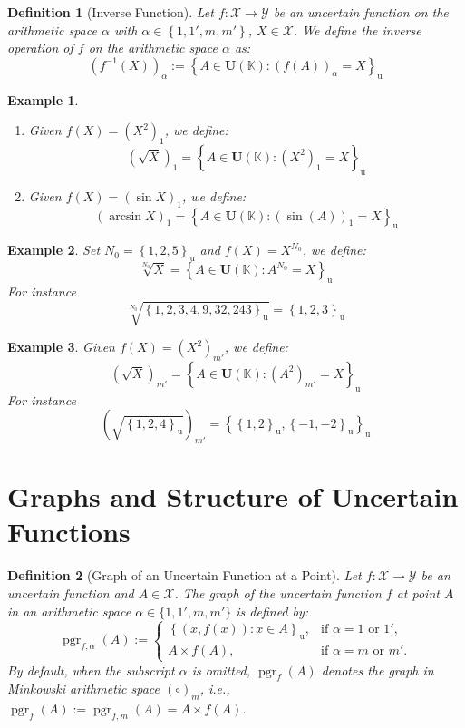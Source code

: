 \documentclass[a4paper,12pt, twoside]{memoir}
\newtheorem{definition}{Definition}[chapter]
\newtheorem{example}{Example}[chapter]
\DeclareMathOperator{\pgr}{pgr}
\newcommand{\set}[1]{\left\{#1\right\}} %
\newcommand{\s}[1]{\set{#1}_\mathrm{u}} %
\newcommand{\tsbd}[1]{\mathbf{U}(\mathbb{#1})}
\newcommand{\kgdd}[1]{\left(#1\right)_1} %
\newcommand{\kgdtmr}[1]{\left(#1\right)_{m'}} %
\begin{document}
\begin{definition}[Inverse Function]
	Let $f : \mathcal{X} \to \mathcal{Y}$ be an uncertain function on the arithmetic space $\alpha$ with $\alpha \in \set{1,1',m,m'}$, $X \in \mathcal{X}$. We define the inverse operation of $f$ on the arithmetic space $\alpha$ as:
	\[
		(f^{-1}(X))_{\alpha} := \s{A \in \tsbd{K}: (f(A))_\alpha = X}
	\]
\end{definition}

\begin{example}
	\begin{enumerate}[leftmargin=*]
		\item Given $f(X)=\kgdd{X^2}$, we define: \[\kgdd{\sqrt{X}} = \s{A \in \tsbd{K} : \kgdd{X^2} = X}\]
		\item Given $f(X)=\kgdd{\sin{X}}$, we define: \[\kgdd{\arcsin{X}} = \s{A \in \tsbd{K} : \kgdd{\sin(A)} = X}\]
	\end{enumerate}
\end{example}

\begin{example}
	Set $N_0 = \s{1,2,5}$ and $f(X)=X^{N_0}$, we define: \[\sqrt[N_0]{X} = \s{A \in \tsbd{K} : A^{N_0} = X}\]
	For instance \[\sqrt[N_0]{\s{1, 2, 3, 4, 9, 32, 243}} = \s{1,2,3}\]
\end{example}

\begin{example}
	Given $f(X)=\kgdtmr{X^2}$, we define: \[\kgdtmr{\sqrt{X}} = \s{A \in \tsbd{K} : \kgdtmr{A^2} = X}\]
	For instance \[\kgdtmr{\sqrt{\s{1, 2, 4}}} = \s{\s{1,2},\s{-1,-2}}\]
\end{example}

\section{Graphs and Structure of Uncertain Functions}

\begin{definition}[Graph of an Uncertain Function at a Point]
	Let $f : \mathcal{X} \to \mathcal{Y}$ be an uncertain function and $A \in \mathcal{X}$. The graph of the uncertain function $f$ at point $A$ in an arithmetic space $\alpha \in \{1, 1', m, m'\}$ is defined by:
	\[
		\pgr_{f, \alpha}(A) := \begin{cases}
			\s{(x, f(x)) : x \in A}, & \text{if } \alpha = 1 \text{ or } 1', \\[1ex]
			A \times f(A),           & \text{if } \alpha = m \text{ or } m'.
		\end{cases}
	\]
	By default, when the subscript $\alpha$ is omitted, $\pgr_f(A)$ denotes the graph in Minkowski arithmetic space $(\circ)_m$, i.e., $\pgr_f(A) := \pgr_{f, m}(A) = A \times f(A)$.
\end{definition}
\end{document}
